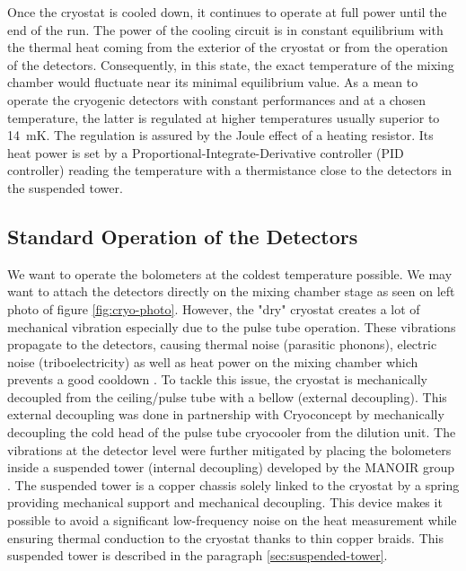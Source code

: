 Once the cryostat is cooled down, it continues to operate at full power until the end of the run. The power of the cooling circuit is in constant equilibrium with the thermal heat coming from the exterior of the cryostat or from the operation of the detectors. Consequently, in this state, the exact temperature of the mixing chamber would fluctuate near its minimal equilibrium value. 
As a mean to operate the cryogenic detectors with constant performances and at a chosen temperature, the latter is regulated at higher temperatures usually superior to \SI{14}{\milli\kelvin}. The regulation is assured by the Joule effect of a heating resistor. Its heat power is set by a Proportional-Integrate-Derivative controller (PID controller) reading the temperature with a  thermistance close to the detectors in the suspended tower.


\subsection{Standard Operation of the Detectors}

We want to operate the bolometers at the coldest temperature possible. We may want to attach the detectors directly on the mixing chamber stage as seen on left photo of figure \ref{fig:cryo-photo}. However, the "dry" cryostat creates a lot of mechanical vibration especially due to the pulse tube operation. These vibrations propagate to the detectors, causing thermal noise (parasitic phonons), electric noise (triboelectricity) as well as heat power on the mixing chamber which prevents a good cooldown \cite{Olivieri:2017lqz}.
To tackle this issue, the cryostat is mechanically decoupled from the ceiling/pulse tube with a bellow (external decoupling). This external decoupling was done in partnership with Cryoconcept by mechanically decoupling the cold head of the pulse tube cryocooler from the dilution unit. The vibrations at the detector level were further mitigated by placing the bolometers inside a suspended tower (internal decoupling) developed by the MANOIR group \cite{Maisonobe:2018tbq}.
The suspended tower is a copper chassis solely linked to the cryostat by a spring providing mechanical support and mechanical decoupling. This device makes it possible to avoid a significant low-frequency noise on the heat measurement while ensuring thermal conduction to the cryostat thanks to thin copper braids. This suspended tower is described in the paragraph \ref{sec:suspended-tower}.

